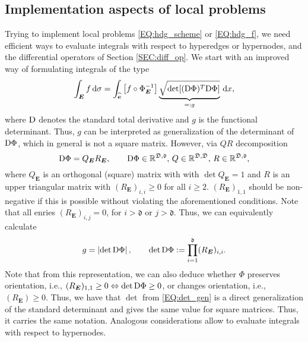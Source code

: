 \documentclass[a4paper, english, 12pt, reqno, draft]{amsart}
\theoremstyle{definition}
\theoremstyle{remark}
\numberwithin{equation}{section}
\newcommand{\Edge}{{\ensuremath{\boldsymbol E}}}
\newcommand{\RefEdge}{{\ensuremath{\widehat{\boldsymbol e}}}}
\newcommand{\locDim}{\ensuremath{\mathfrak d}}
\newcommand{\globDim}{\ensuremath{\mathfrak D}}
\newcommand{\diffeo}{\ensuremath{\Phi}}
\newcommand{\der}{\ensuremath{\textup D}}
\newcommand{\funcDet}{\ensuremath{g}}
\newcommand{\matQ}{\ensuremath{Q}}
\newcommand{\matR}{\ensuremath{R}}
\newcommand{\IR}{\ensuremath{\mathbb R}}
\newcommand{\dx}{\ensuremath{\, \textup d x}}
\newcommand{\ds}{\ensuremath{\, \textup d \sigma}}
\begin{document}
\subsection{Implementation aspects of local problems}\label{SEC:HDG_loc_prob}
% 
Trying to implement local problems \eqref{EQ:hdg_scheme} or \eqref{EQ:hdg_f}, we need efficient ways to evaluate integrals with respect to hyperedges or hypernodes, and the differential operators of Section \ref{SEC:diff_op}. We start with an improved way of formulating integrals of the type
% 
\begin{equation}
 \int_\Edge f \ds = \int_\RefEdge \left[f \circ \diffeo^{-1}_\Edge\right] \underbrace{ \sqrt{\det[(\der\diffeo)^T \der \diffeo]} }_{ =: \funcDet }\dx,
\end{equation}
% 
where $\der$ denotes the standard total derivative and $\funcDet$ is the functional determinant. Thus, $g$ can be interpreted as generalization of the determinant of $\der\diffeo$, which in general is not a square matrix. However, via $\matQ\matR$ decomposition
% 
\begin{equation}\label{EQ:QR_decomp}
 \der\diffeo = \matQ_\Edge \matR_\Edge, \qquad \der\diffeo \in \IR^{\globDim,\locDim}, \, \matQ \in \IR^{\globDim,\globDim}, \, \matR \in \IR^{\globDim,\locDim},
\end{equation}
% 
where $\matQ_\Edge$ is an orthogonal (square) matrix with with $\det \matQ_\Edge = 1$ and $\matR$ is an upper triangular matrix with $(\matR_\Edge)_{i,i} \ge 0$ for all $i \ge 2$.  $(\matR_\Edge)_{1,1}$ should be non-negative if this is possible without violating the aforementioned conditions. Note that all enries $(\matR_\Edge)_{i,j} = 0$, for $i > \locDim$ or $j > \locDim$. Thus, we can equivalently calculate
% 
\begin{equation}\label{EQ:det_gen}
 \funcDet = \left| \det\der\diffeo \right|, \qquad \det\der\diffeo := \prod_{i=1}^\locDim (\matR_\Edge)_{i,i}.
\end{equation}
% 
Note that from this representation, we can also deduce whether $\diffeo$ preserves orientation, i.e., $(\matR_\Edge)_{1,1} \ge 0 \Leftrightarrow \det\der\diffeo \ge 0$, or changes orientation, i.e., $(\matR_\Edge) \ge 0$. Thus, we have that $\det$ from \eqref{EQ:det_gen} is a direct generalization of the standard determinant and gives the same value for square matrices. Thus, it carries the same notation. Analogous considerations allow to evaluate integrals with respect to hypernodes.
\end{document}
